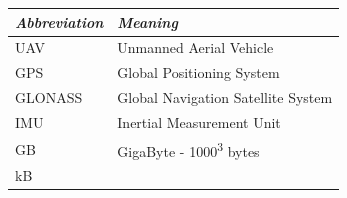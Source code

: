 \documentclass[12pt,oneside]{reedthesis}
\theoremstyle{definition}
\theoremstyle{definition}
\theoremstyle{definition}
\theoremstyle{remark}
\begin{document}
  \begin{abbrvs}
    \begin{longtable}[]{@{}ll@{}}
    \toprule
    \begin{minipage}[b]{0.26\columnwidth}\raggedright\strut
    \emph{Abbreviation}\strut
    \end{minipage} & \begin{minipage}[b]{0.41\columnwidth}\raggedright\strut
    \emph{Meaning}\strut
    \end{minipage}\tabularnewline
    \midrule
    \endhead
    \begin{minipage}[t]{0.26\columnwidth}\raggedright\strut
    UAV\strut
    \end{minipage} & \begin{minipage}[t]{0.41\columnwidth}\raggedright\strut
    Unmanned Aerial Vehicle\strut
    \end{minipage}\tabularnewline
    \begin{minipage}[t]{0.26\columnwidth}\raggedright\strut
    GPS\strut
    \end{minipage} & \begin{minipage}[t]{0.41\columnwidth}\raggedright\strut
    Global Positioning System\strut
    \end{minipage}\tabularnewline
    \begin{minipage}[t]{0.26\columnwidth}\raggedright\strut
    GLONASS\strut
    \end{minipage} & \begin{minipage}[t]{0.41\columnwidth}\raggedright\strut
    Global Navigation Satellite System\strut
    \end{minipage}\tabularnewline
    \begin{minipage}[t]{0.26\columnwidth}\raggedright\strut
    IMU\strut
    \end{minipage} & \begin{minipage}[t]{0.41\columnwidth}\raggedright\strut
    Inertial Measurement Unit\strut
    \end{minipage}\tabularnewline
    \begin{minipage}[t]{0.26\columnwidth}\raggedright\strut
    GB\strut
    \end{minipage} & \begin{minipage}[t]{0.41\columnwidth}\raggedright\strut
    GigaByte - 1000\textsuperscript{3} bytes\strut
    \end{minipage}\tabularnewline
    \begin{minipage}[t]{0.26\columnwidth}\raggedright\strut
    kB\strut
    \end{minipage} & \begin{minipage}[t]{0.41\columnwidth}\raggedright\strut

\end{minipage}
\end{longtable}
\end{abbrvs}
\end{document}
